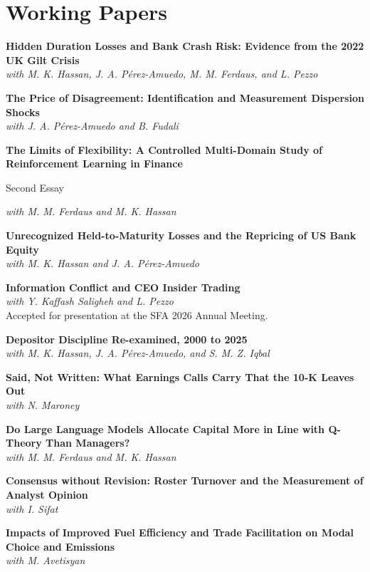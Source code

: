 \documentclass[11pt,letterpaper]{article}
\newcommand{\entry}[2]{%
  \noindent\begin{minipage}[t]{0.72\textwidth}\raggedright #1\end{minipage}%
  \hfill%
  \begin{minipage}[t]{0.27\textwidth}\raggedleft #2\end{minipage}\par
}
\newcommand{\hgap}{\par\vspace{3pt}}
\newcommand{\gap}{\par\vspace{8pt}}
\begin{document}
\section{Working Papers}

\textbf{Hidden Duration Losses and Bank Crash Risk: Evidence from the 2022 UK Gilt Crisis}\\[3pt]
\textit{with M. K. Hassan, J. A. P\'erez-Amuedo, M. M. Ferdaus, and L. Pezzo}
\gap

\textbf{The Price of Disagreement: Identification and Measurement Dispersion Shocks}\\[3pt]
\textit{with J. A. P\'erez-Amuedo and B. Fudali}
\gap

\entry{\textbf{The Limits of Flexibility: A Controlled Multi-Domain Study of Reinforcement Learning in Finance}}{Second Essay}
\hgap
\textit{with M. M. Ferdaus and M. K. Hassan}
\gap

\textbf{Unrecognized Held-to-Maturity Losses and the Repricing of US Bank Equity}\\[3pt]
\textit{with M. K. Hassan and J. A. P\'erez-Amuedo}

\gap

\textbf{Information Conflict and CEO Insider Trading}\\[3pt]
\textit{with Y. Kaffash Saligheh and L. Pezzo}\\
Accepted for presentation at the SFA 2026 Annual Meeting.
\gap

\textbf{Depositor Discipline Re-examined, 2000 to 2025}\\[3pt]
\textit{with M. K. Hassan, J. A. P\'erez-Amuedo, and S. M. Z. Iqbal}
\gap

\textbf{Said, Not Written: What Earnings Calls Carry That the 10-K Leaves Out}\\[3pt]
\textit{with N. Maroney}
\gap

\textbf{Do Large Language Models Allocate Capital More in Line with Q-Theory Than Managers?}\\[3pt]
\textit{with M. M. Ferdaus and M. K. Hassan}
\gap

\textbf{Consensus without Revision: Roster Turnover and the Measurement of Analyst Opinion}\\[3pt]
\textit{with I. Sifat}
\gap

\textbf{Impacts of Improved Fuel Efficiency and Trade Facilitation on Modal Choice and Emissions}\\[3pt]
\textit{with M. Avetisyan}
\end{document}
